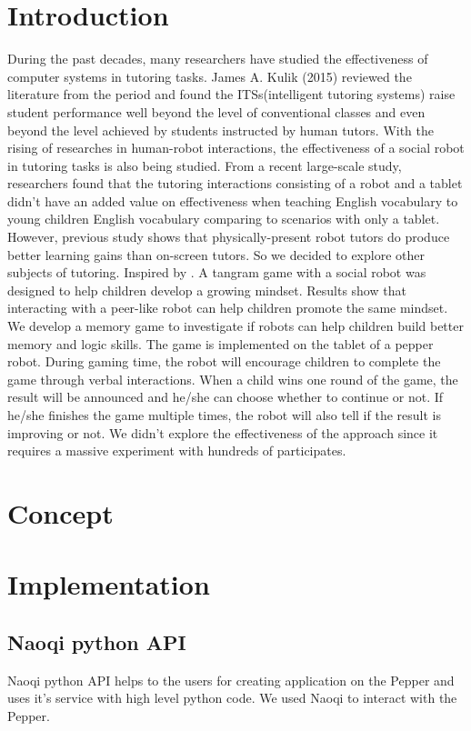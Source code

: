 \documentclass[12pt]{article}
\begin{document}
\section{Introduction}
During the past decades, many researchers have studied the effectiveness of computer systems in tutoring tasks. James A. Kulik (2015)\cite{0034654315581420} reviewed the literature from the period and found the ITSs(intelligent tutoring systems) raise student performance well beyond the level of conventional classes and even beyond the level achieved by students instructed by human tutors. With the rising of researches in human-robot interactions, the effectiveness of a social robot in tutoring tasks is also being studied. From a recent large-scale study\cite{8673077}, researchers found that the tutoring interactions consisting of a robot and a tablet didn't have an added value on effectiveness when teaching English vocabulary to young children English vocabulary comparing to scenarios with only a tablet. However, previous study shows that physically-present robot tutors do produce better learning gains than on-screen tutors\cite{Leyzberg_thephysical}. So we decided to explore other subjects of tutoring. Inspired by  \cite{Park:2017:GGM:2909824.3020213}. A tangram game with a social robot was designed to help children develop a growing mindset. Results show that interacting with a peer-like robot can help children promote the same mindset. We develop a memory game to investigate if robots can help children build better memory and logic skills. The game is implemented on the tablet of a pepper robot. During gaming time, the robot will encourage children to complete the game through verbal interactions. When a child wins one round of the game, the result will be announced and he/she can choose whether to continue or not. If he/she finishes the game multiple times, the robot will also tell if the result is improving or not. We didn't explore the effectiveness of the approach since it requires a massive experiment with hundreds of participates.
 
\newpage
\section{Concept}

\newpage
\section{Implementation}
\subsection{Naoqi python API}
Naoqi python API helps to the users for creating application on the Pepper and uses it's service with high level python code. We used Naoqi to interact with the Pepper.
\end{document}
